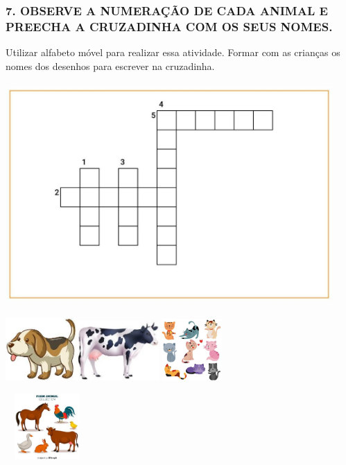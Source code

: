 \subsubsection{7. OBSERVE A NUMERAÇÃO DE CADA ANIMAL E PREECHA A
CRUZADINHA COM OS SEUS
NOMES.}\label{observe-a-numerauxe7uxe3o-de-cada-animal-e-preecha-a-cruzadinha-com-os-seus-nomes.}

Utilizar alfabeto móvel para realizar essa atividade. Formar com as
crianças os nomes dos desenhos para escrever na cruzadinha.

\includegraphics[width=4.90625in,height=3.34375in]{media/image90.jpg}

\includegraphics[width=1.06250in,height=0.94306in]{media/image91.jpg}\includegraphics[width=1.24583in,height=0.90625in]{media/image92.jpg}\includegraphics[width=0.97639in,height=0.92708in]{media/image93.jpg}

\includegraphics[width=1.25000in,height=0.99097in]{media/image94.jpg}

